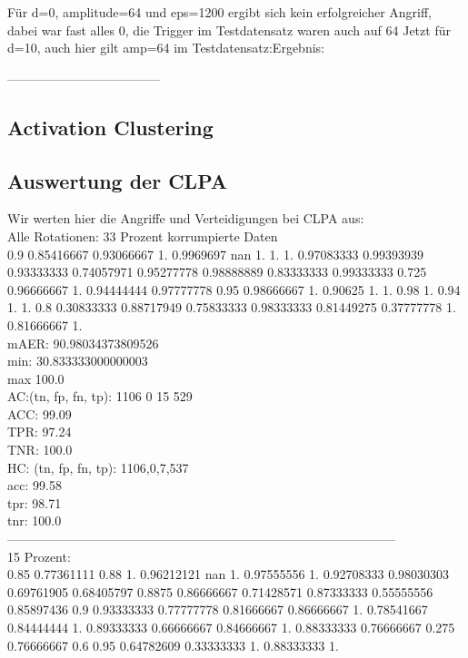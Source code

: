 \documentclass[11pt,a4paper]{article}
\numberwithin{equation}{section}
\begin{document}
	Für d=0, amplitude=64 und eps=1200 ergibt sich kein erfolgreicher Angriff, dabei war fast alles 0, die Trigger im Testdatensatz waren auch auf 64
	Jetzt für d=10, auch hier gilt amp=64 im Testdatensatz:Ergebnis:
	
	
	------------------------------------
	\subsection{Activation Clustering}
	
	\subsection{Auswertung der CLPA}
	Wir werten hier die Angriffe und Verteidigungen bei CLPA aus:\\
	
	Alle Rotationen: 33 Prozent korrumpierte Daten\\
	0.9        0.85416667 0.93066667 1.         0.9969697         nan
	1.         1.         1.         0.97083333 0.99393939 0.93333333
	0.74057971 0.95277778 0.98888889 0.83333333 0.99333333 0.725
	0.96666667 1.         0.94444444 0.97777778 0.95       0.98666667
	1.         0.90625    1.         1.         0.98       1.
	0.94       1.         1.         0.8        0.30833333 0.88717949
	0.75833333 0.98333333 0.81449275 0.37777778 1.         0.81666667
	1. 
	\\
	
	mAER:  90.98034373809526\\
	min:  30.833333000000003\\
	max  100.0\\
	
	AC:(tn, fp, fn, tp):  1106 0 15 529\\
	ACC: 99.09\\
	TPR:  97.24\\
	TNR:  100.0\\
	
	HC: (tn, fp, fn, tp): 1106,0,7,537\\
	acc: 99.58\\
	tpr: 98.71\\
	tnr: 100.0\\
	--------------------------------------------------------------------------------------------\\
	15 Prozent:\\
	0.85       0.77361111 0.88       1.         0.96212121        nan
	1.         0.97555556 1.         0.92708333 0.98030303 0.69761905
	0.68405797 0.8875     0.86666667 0.71428571 0.87333333 0.55555556
	0.85897436 0.9        0.93333333 0.77777778 0.81666667 0.86666667
	1.         0.78541667 0.84444444 1.         0.89333333 0.66666667
	0.84666667 1.         0.88333333 0.76666667 0.275      0.76666667
	0.6        0.95       0.64782609 0.33333333 1.         0.88333333
	1.       
	
\end{document}
